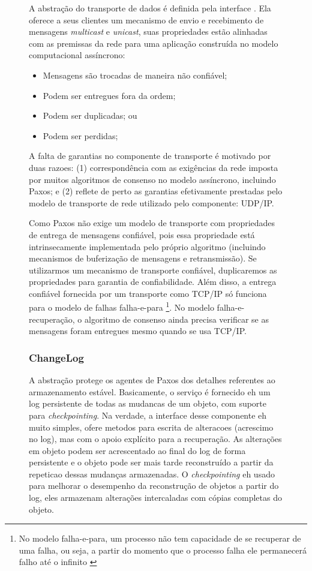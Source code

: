 \begin{figure}[ht]
A abstração do transporte de dados é definida pela interface . Ela
oferece a seus clientes um mecanismo de envio e recebimento de mensagens \emph{multicast}
e \emph{unicast}, suas propriedades estão alinhadas com as premissas da rede para uma
aplicação construída no modelo computacional assíncrono:

\begin{itemize}
  \item Mensagens são trocadas de maneira não confiável;
  \item Podem ser entregues fora da ordem;
  \item Podem ser duplicadas; ou
  \item Podem ser perdidas;
\end{itemize}

A falta de garantias no componente de transporte é motivado por duas razoes: (1)
correspondência com as exigências da rede imposta por muitos algoritmos de consenso no
modelo assíncrono, incluindo Paxos; e (2) reflete de perto as garantias efetivamente
prestadas pelo modelo de transporte de rede utilizado pelo componente: UDP/IP.

Como Paxos não exige um modelo de transporte com propriedades de entrega de mensagens
confiável, pois essa propriedade está intrinsecamente implementada pelo próprio algoritmo
(incluindo mecanismos de buferização de mensagens e retransmissão). Se utilizarmos um
mecanismo de transporte confiável, duplicaremos as propriedades para garantia de
confiabilidade. Além disso, a entrega confiável fornecida por um transporte como TCP/IP só
funciona para o modelo de falhas falha-e-para \cite{abdellatif04} \footnote{No modelo
falha-e-para, um processo não tem capacidade de se recuperar de uma falha, ou seja, a
partir do momento que o processo falha ele permanecerá falho até o infinito
\cite{cachin11}}. No modelo falha-e-recuperação, o algoritmo de consenso ainda precisa
verificar se as mensagens foram entregues mesmo quando se usa TCP/IP.

\subsubsection{ChangeLog}

A abstração  protege os agentes de Paxos dos detalhes referentes ao
armazenamento estável. Basicamente, o serviço é fornecido eh um log persistente de todas
as mudancas de um objeto, com suporte para \emph{checkpointing}. Na verdade, a interface
desse componente eh muito simples, ofere metodos para escrita de alteracoes (acrescimo no
log), mas com o apoio explícito para a recuperação. As alterações em objeto podem ser
acrescentado ao final do log de forma persistente e o objeto pode ser mais tarde
reconstruído a partir da repeticao dessas mudanças armazenadas. O \emph{checkpointing} eh
usado para melhorar o desempenho da reconstrução de objetos a partir do log, eles
armazenam alterações intercaladas com cópias completas do objeto.


\end{figure}
